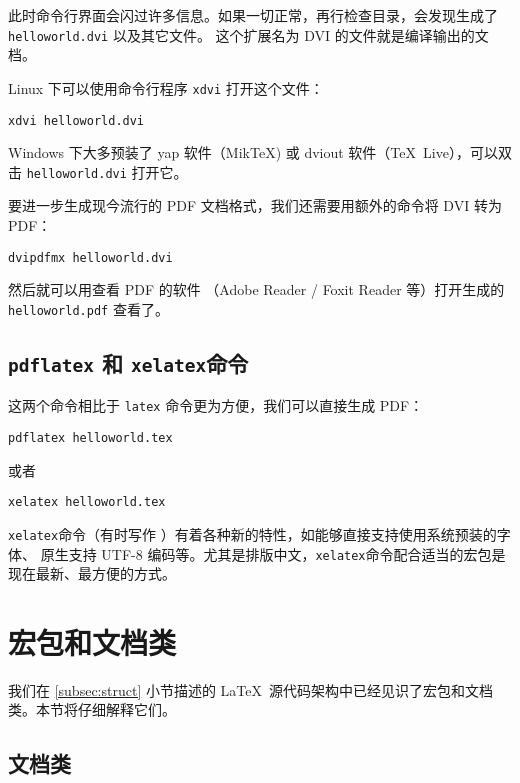 此时命令行界面会闪过许多信息。如果一切正常，再行检查目录，会发现生成了 \texttt{helloworld\-.dvi} 以及其它文件。
这个扩展名为 DVI 的文件就是编译输出的文档。

Linux 下可以使用命令行程序 \texttt{xdvi} 打开这个文件：
\begin{verbatim}
xdvi helloworld.dvi
\end{verbatim}

Windows 下大多预装了 yap 软件（Mik\TeX) 或 dviout 软件（\TeX\ Live），可以双击 \texttt{hello\-world.dvi} 打开它。

要进一步生成现今流行的 PDF 文档格式，我们还需要用额外的命令将 DVI 转为 PDF：
\begin{verbatim}
dvipdfmx helloworld.dvi
\end{verbatim}

然后就可以用查看 PDF 的软件 （Adobe Reader / Foxit Reader 等）打开生成的 \texttt{hello\-world.pdf} 查看了。

\subsection{\texttt{pdflatex} 和 \texttt{xelatex}命令}

这两个命令相比于 \texttt{latex} 命令更为方便，我们可以直接生成 PDF：
\begin{verbatim}
pdflatex helloworld.tex
\end{verbatim}

或者
\begin{verbatim}
xelatex helloworld.tex
\end{verbatim}

\texttt{xelatex}命令（有时写作 ）有着各种新的特性，如能够直接支持使用系统预装的字体、
原生支持 UTF-8 编码等。尤其是排版中文，\texttt{xelatex}命令配合适当的宏包是现在最新、最方便的方式。

\section{宏包和文档类}\label{sec:latex-pkgs}

我们在 \ref{subsec:struct} 小节描述的 \LaTeX\ 源代码架构中已经见识了宏包和文档类。本节将仔细解释它们。

\subsection{文档类}\label{subsec:classes}

